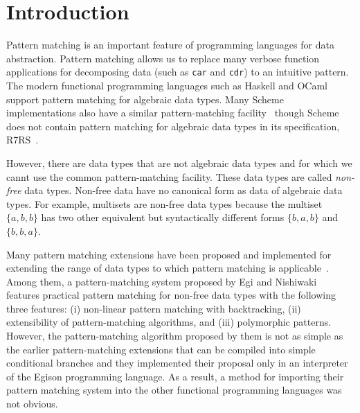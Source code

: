 \documentclass[acmlarge]{acmart}
\begin{document}


\maketitle

\section{Introduction}\label{intro}

Pattern matching is an important feature of programming languages for data abstraction.
Pattern matching allows us to replace many verbose function applications for decomposing data (such as \texttt{car} and \texttt{cdr}) to an intuitive pattern.
The modern functional programming languages such as Haskell and OCaml support pattern matching for algebraic data types.
Many Scheme implementations also have a similar pattern-matching facility~\cite{gauchePM} though Scheme does not contain pattern matching for algebraic data types in its specification, R7RS~\cite{shinn2013revised}.

However, there are data types that are not algebraic data types and for which we cannt use the common pattern-matching facility.
These data types are called \emph{non-free} data types.
Non-free data have no canonical form as data of algebraic data types.
For example, multisets are non-free data types because the multiset $\{a,b,b\}$ has two other equivalent but syntactically different forms $\{b,a,b\}$ and $\{b,b,a\}$.

Many pattern matching extensions have been proposed and implemented for extending the range of data types to which pattern matching is applicable~\cite{Hudak07ahistory,turner2012some}.
Among them, a pattern-matching system proposed by Egi and Nishiwaki~\cite{egi2018aplas} features practical pattern matching for non-free data types with the following three features: (i) non-linear pattern matching with backtracking, (ii) extensibility of pattern-matching algorithms, and (iii) polymorphic patterns.
However, the pattern-matching algorithm proposed by them is not as simple as the earlier pattern-matching extensions that can be compiled into simple conditional branches and they implemented their proposal only in an interpreter of the Egison programming language.
As a result, a method for importing their pattern matching system into the other functional programming languages was not obvious.
\end{document}
